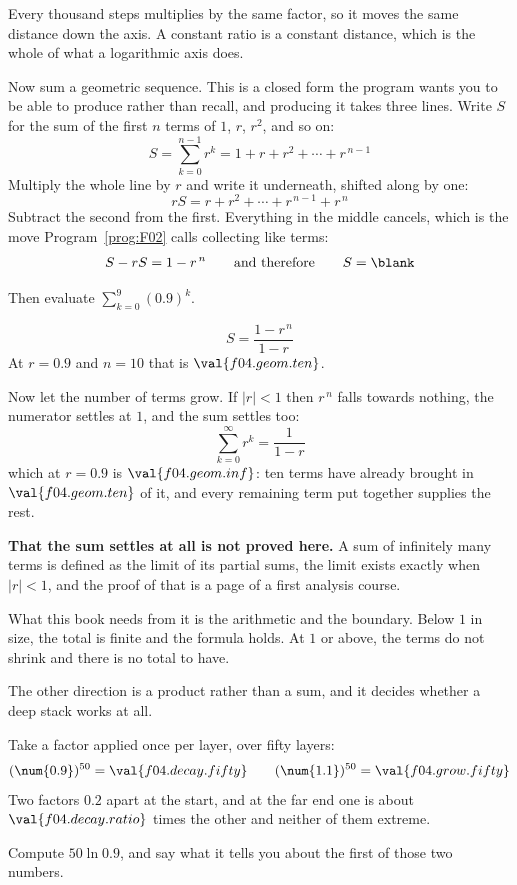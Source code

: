 \begin{fr}
Every thousand steps multiplies by the same factor, so it moves the same
distance down the axis. A constant ratio is a constant distance, which is the
whole of what a logarithmic axis does.

Now sum a geometric sequence. This is a closed form the program wants you to be
able to produce rather than recall, and producing it takes three
lines. Write $S$ for the sum of the first $n$ terms of $1$, $r$, $r^{2}$, and
so on:
\[ S = \sum_{k=0}^{n-1} r^{k} = 1 + r + r^{2} + \cdots + r^{\,n-1} \]
Multiply the whole line by $r$ and write it underneath, shifted along by one:
\[ rS = r + r^{2} + \cdots + r^{\,n-1} + r^{\,n} \]
Subtract the second from the first. Everything in the middle cancels, which is
the move Program~\ref{prog:F02} calls collecting like terms:
\[ S - rS = 1 - r^{\,n} \qquad\text{and therefore}\qquad S = \blank \]

Then evaluate $\sum_{k=0}^{9} (\num{0.9})^{k}$.
\dotline
\nextframe
\end{fr}

\begin{fr}
\begin{ansblock}
\[ S = \frac{1 - r^{\,n}}{1 - r} \]
At $r = \num{0.9}$ and $n = 10$ that is $\val{f04.geom.ten}$.
\end{ansblock}

Now let the number of terms grow. If $\lvert r \rvert < 1$ then $r^{\,n}$
falls towards nothing, the numerator settles at $1$, and the sum settles too:
\[ \sum_{k=0}^{\infty} r^{k} = \frac{1}{1-r} \]
which at $r = \num{0.9}$ is $\val{f04.geom.inf}$: ten terms have already
brought in $\val{f04.geom.ten}$ of it, and every remaining term put together
supplies the rest.

\begin{rigourbox}
\textbf{That the sum settles at all is not proved here.} A sum of infinitely
many terms is defined as the limit of its partial sums, the limit exists
exactly when $\lvert r \rvert < 1$, and the proof of that is a page of a first
analysis course.

What this book needs from it is the arithmetic and the boundary. Below $1$ in
size, the total is finite and the formula holds. At $1$ or above, the terms do
not shrink and there is no total to have.
\end{rigourbox}
\end{fr}

\begin{fr}
The other direction is a product rather than a sum, and it decides whether a
deep stack works at all.

Take a factor applied once per layer, over fifty layers:
\[ (\num{0.9})^{50} = \val{f04.decay.fifty} \qquad
   (\num{1.1})^{50} = \val{f04.grow.fifty} \]
Two factors $\num{0.2}$ apart at the start, and at the far end one is about
$\val{f04.decay.ratio}$ times the other \dash{} and neither of them extreme.

\yourturn
Compute $50 \ln \num{0.9}$, and say what it tells you about the first of those
two numbers.
\dotline
\nextframe
\end{fr}

